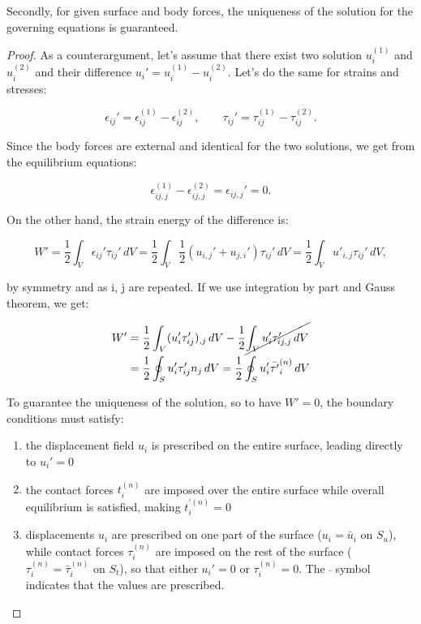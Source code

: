 	Secondly, for given surface and body forces, the uniqueness of the solution for the governing equations is guaranteed. 
	
	\begin{proof}
	As a counterargument, let's assume that there exist two solution $u_i^{(1)}$ and $u_i^{(2)}$ and their difference $u_i ' = u_i^{(1)}-u_i^{(2)}$. Let's do the same for strains and stresses:
	
	\begin{equation}
	\epsilon _{ij} ' = \epsilon_{ij}^{(1)}-\epsilon _{ij}^{(2)}, \qquad \tau _{ij} ' = \tau _{ij}^{(1)}-\tau _{ij}^{(2)}.
	\end{equation}
	
	Since the body forces are external and identical for the two solutions, we get from the equilibrium equations:
	
	\begin{equation}
	\epsilon_{ij,j}^{(1)}-\epsilon _{ij,j}^{(2)} = \epsilon _{ij,j} ' = 0. 
	\end{equation}
	
	On the other hand, the strain energy of the difference is:
	
	\begin{equation}
	W' = \frac{1}{2}\int _V \epsilon _{ij} ' \tau _{ij} ' \, dV =  \frac{1}{2}\int _V \frac{1}{2} (u _{i,j} '+ u _{j,i} ') \tau _{ij} ' \, dV = \frac{1}{2}\int _V u' _{i,j} \tau _{ij} ' \, dV,
	\end{equation}
	
	by symmetry and as i, j are repeated. If we use integration by part and Gauss theorem, we get:
	
	\begin{equation}
	\begin{aligned}
	W' &= \frac{1}{2} \int _V (u' _{i} \tau ' _{ij})_{,j} \, dV - \frac{1}{2} \cancel{\int _V u' _{i} \tau ' _{ij,j} \, dV} \\
	&= \frac{1}{2} \oint _S u' _{i} \tau ' _{ij} n_j \, dV = \frac{1}{2} \oint _S u' _{i} \bar{\tau '} _{i}^{(n)} \, dV
	\end{aligned}
	\end{equation}
	
	To guarantee the uniqueness of the solution, so to have $W' = 0$, the boundary conditions must satisfy:
	
	\begin{enumerate}
	\item the displacement field $u_i$ is prescribed on the entire surface, leading directly to $u_i ' = 0$
	
	\item the contact forces $t_i ^{(n)}$ are imposed over the entire surface while overall equilibrium is satisfied, making $t_i ^{'(n)} = 0$
	
	\item displacements $u_i$ are prescribed on one part of the surface ($u_i = \bar{u}_i$ on $S_u$), while contact forces $\tau _i^{(n)}$ are imposed on the rest of the surface ($\tau _i^{(n)} = \bar{\tau} _i^{(n)}$ on $S_t$), so that either $u_i '= 0$ or $\tau _i^{(n)}= 0$. The $\bar{ }$ symbol indicates that the values are prescribed. 
	\end{enumerate}
	\end{proof}
	
